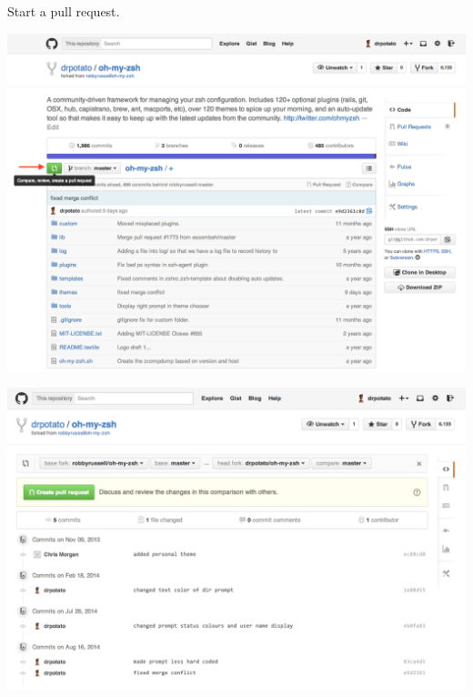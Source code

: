 \documentclass{tufte-handout}
\begin{document}
\pagebreak
Start a pull request.

\includegraphics[scale=0.4]{img/github-start-pull-request.png}

\includegraphics[scale=0.4]{img/github-finish-pull-request.png}
\end{document}
